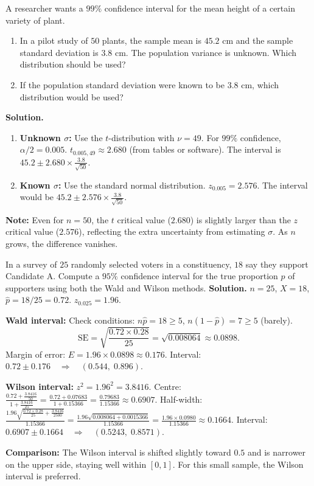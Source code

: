 \documentclass[11pt]{article}
\begin{document}
\begin{exoresolu}
A researcher wants a $99\%$ confidence interval for the mean height of a certain variety of plant.
\begin{enumerate}
\item In a pilot study of $50$ plants, the sample mean is $45.2$ cm and the sample standard deviation is $3.8$ cm. The population variance is unknown. Which distribution should be used?
\item If the population standard deviation were known to be $3.8$ cm, which distribution would be used?
\end{enumerate}
\tcblower
\textbf{Solution.}
\begin{enumerate}
\item \textbf{Unknown $\sigma$:} Use the $t$-distribution with $\nu = 49$. For $99\%$ confidence, $\alpha/2 = 0.005$. $t_{0.005,49} \approx 2.680$ (from tables or software). The interval is $45.2 \pm 2.680 \times \frac{3.8}{\sqrt{50}}$.
\item \textbf{Known $\sigma$:} Use the standard normal distribution. $z_{0.005} = 2.576$. The interval would be $45.2 \pm 2.576 \times \frac{3.8}{\sqrt{50}}$.
\end{enumerate}
\textbf{Note:} Even for $n=50$, the $t$ critical value ($2.680$) is slightly larger than the $z$ critical value ($2.576$), reflecting the extra uncertainty from estimating $\sigma$. As $n$ grows, the difference vanishes.
\end{exoresolu}

\begin{exoresolu}
In a survey of $25$ randomly selected voters in a constituency, $18$ say they support Candidate A. Compute a $95\%$ confidence interval for the true proportion $p$ of supporters using both the Wald and Wilson methods.
\tcblower
\textbf{Solution.}
$n = 25$, $X = 18$, $\hat{p} = 18/25 = 0.72$. $z_{0.025} = 1.96$.

\textbf{Wald interval:}
Check conditions: $n\hat{p} = 18 \ge 5$, $n(1-\hat{p}) = 7 \ge 5$ (barely).
\[
\text{SE} = \sqrt{\frac{0.72 \times 0.28}{25}} = \sqrt{0.008064} \approx 0.0898.
\]
Margin of error: $E = 1.96 \times 0.0898 \approx 0.176$.
Interval: $0.72 \pm 0.176 \quad\Rightarrow\quad (0.544,\; 0.896)$.

\textbf{Wilson interval:}
$z^2 = 1.96^2 = 3.8416$.
Centre: $\displaystyle \frac{0.72 + \frac{3.8416}{50}}{1 + \frac{3.8416}{25}} = \frac{0.72 + 0.07683}{1 + 0.15366} = \frac{0.79683}{1.15366} \approx 0.6907$.
Half-width: $\displaystyle \frac{1.96 \sqrt{\frac{0.72\times0.28}{25} + \frac{3.8416}{2500}}}{1.15366}
= \frac{1.96 \sqrt{0.008064 + 0.0015366}}{1.15366}
= \frac{1.96 \times 0.0980}{1.15366} \approx 0.1664$.
Interval: $0.6907 \pm 0.1664 \quad\Rightarrow\quad (0.5243,\; 0.8571)$.

\textbf{Comparison:} The Wilson interval is shifted slightly toward $0.5$ and is narrower on the upper side, staying well within $[0,1]$. For this small sample, the Wilson interval is preferred.
\end{exoresolu}
\end{document}
